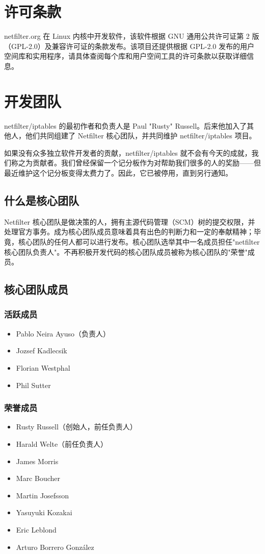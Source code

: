 \documentclass[12pt,UTF8]{ctexbook}
\begin{document}
\section{许可条款}
netfilter.org 在 Linux 内核中开发软件，该软件根据 GNU 通用公共许可证第 2 版（GPL-2.0）及兼容许可证的条款发布。该项目还提供根据 GPL-2.0 发布的用户空间库和实用程序，请具体查阅每个库和用户空间工具的许可条款以获取详细信息。

\section{开发团队}
netfilter/iptables 的最初作者和负责人是 Paul "Rusty" Russell。后来他加入了其他人，他们共同组建了 Netfilter 核心团队，并共同维护 netfilter/iptables 项目。

如果没有众多独立软件开发者的贡献，netfilter/iptables 就不会有今天的成就，我们称之为贡献者。我们曾经保留一个记分板作为对帮助我们很多的人的奖励——但最近维护这个记分板变得太费力了。因此，它已被停用，直到另行通知。

\subsection{什么是核心团队}
Netfilter 核心团队是做决策的人，拥有主源代码管理（SCM）树的提交权限，并处理官方事务。成为核心团队成员意味着具有出色的判断力和一定的奉献精神；毕竟，核心团队的任何人都可以进行发布。核心团队选举其中一名成员担任"netfilter 核心团队负责人"。不再积极开发代码的核心团队成员被称为核心团队的"荣誉"成员。

\subsection{核心团队成员}
\subsubsection{活跃成员}
\begin{itemize}
  \item Pablo Neira Ayuso（负责人）
  \item Jozsef Kadlecsik
  \item Florian Westphal
  \item Phil Sutter
\end{itemize}

\subsubsection{荣誉成员}
\begin{itemize}
  \item Rusty Russell（创始人，前任负责人）
  \item Harald Welte（前任负责人）
  \item James Morris
  \item Marc Boucher
  \item Martin Josefsson
  \item Yasuyuki Kozakai
  \item Eric Leblond
  \item Arturo Borrero González
\end{itemize}
\end{document}
